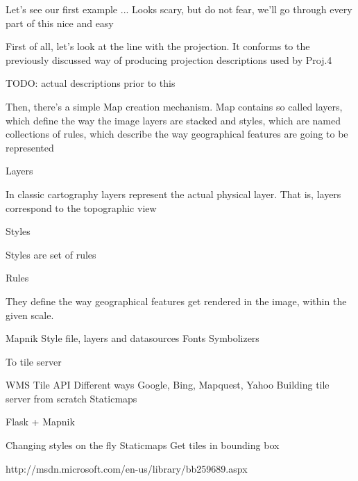 \documentclass{beamer}
\begin{document}
Let's see our first example
...
Looks scary, but do not fear, we'll go through every part of this nice and easy

First of all, let's look at the line with the projection. It conforms to the
previously discussed way of producing projection descriptions used by Proj.4

TODO: actual descriptions prior to this

Then, there's a simple Map creation mechanism. Map contains so called layers,
which define the way the image layers are stacked and styles, which are named
collections of rules, which describe the way geographical features are going
to be represented

Layers

In classic cartography layers represent the actual physical layer. That is,
layers correspond to the topographic view

Styles

Styles are set of rules

Rules

They define the way geographical features get rendered in the image, within
the given scale.




Mapnik
Style file, layers and datasources
Fonts
Symbolizers

To tile server

WMS
Tile API
Different ways
Google, Bing, Mapquest, Yahoo
Building tile server from scratch
Staticmaps

Flask + Mapnik

Changing styles on the fly
Staticmaps
Get tiles in bounding box


http://msdn.microsoft.com/en-us/library/bb259689.aspx
\end{document}
